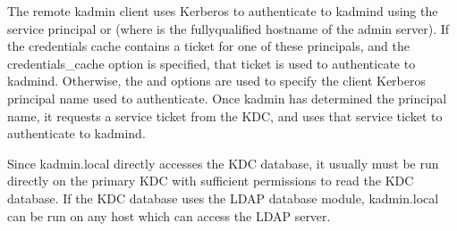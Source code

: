 \documentclass[letterpaper,10pt,english]{sphinxmanual}
\begin{document}
\sphinxAtStartPar
The remote kadmin client uses Kerberos to authenticate to kadmind
using the service principal  or 
(where  is the fully\sphinxhyphen{}qualified hostname of the admin
server).  If the credentials cache contains a ticket for one of these
principals, and the  credentials\_cache option is specified, that
ticket is used to authenticate to kadmind.  Otherwise, the  and
 options are used to specify the client Kerberos principal name
used to authenticate.  Once kadmin has determined the principal name,
it requests a service ticket from the KDC, and uses that service
ticket to authenticate to kadmind.

\sphinxAtStartPar
Since kadmin.local directly accesses the KDC database, it usually must
be run directly on the primary KDC with sufficient permissions to read
the KDC database.  If the KDC database uses the LDAP database module,
kadmin.local can be run on any host which can access the LDAP server.
\end{document}
